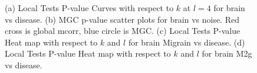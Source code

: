\documentclass[11pt]{article}
\begin{document}
\begin{figure}[htbp]
\centering
{}
\hfil
\centering
{}
\hfil
\centering
{}
\hfil
\centering
{}
\caption{
(a) Local Tests P-value Curves with respect to $k$ at $l=4$ for brain vs disease. 
(b) MGC p-value scatter plots for brain vs noise. Red cross is global mcorr, blue circle is MGC.
(c) Local Tests P-value Heat map with respect to $k$ and $l$ for brain Migrain vs disease. 
(d) Local Tests P-value Heat map with respect to $k$ and $l$ for brain M2g vs disease. }
\label{figReal}
\end{figure}
\end{document}
